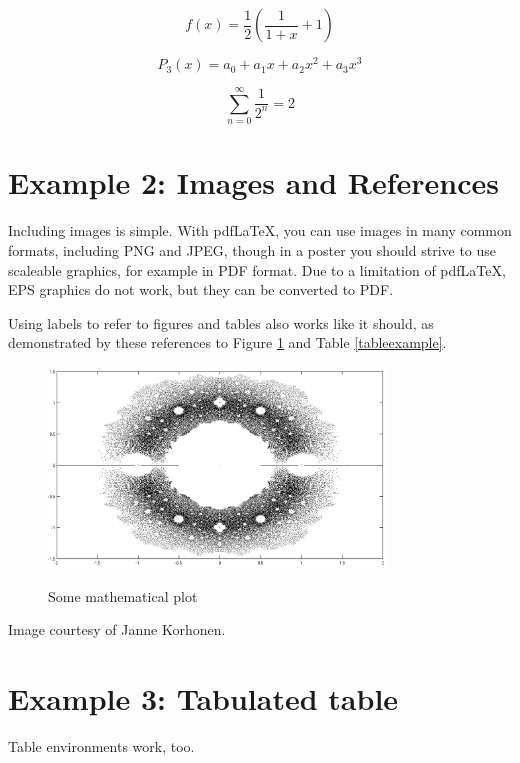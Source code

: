 \documentclass[final]{beamer}
\begin{document}
\begin{poster}
\begin{equation}
	f(x) = \frac{1}{2}\left(\frac{1}{1+x} + 1\right)
\end{equation}

\begin{equation}
	P_3(x) = a_0 + a_1 x + a_2 x^2 + a_3 x^3
\end{equation}

\begin{equation}
	\sum_{n=0}^\infty \frac{1}{2^n} = 2
\end{equation}



\section{Example 2: Images and References}
Including images is simple.  With pdf\LaTeX, you can use images in many common formats, including PNG and JPEG, though in a poster you should strive to use scaleable graphics, for example in PDF format. Due to a limitation of pdf\LaTeX, EPS graphics do not work, but they can be converted to PDF.
	
Using labels to refer to figures and tables also works like it should, as demonstrated by these references to Figure \ref{examplefigure} and Table \ref{tableexample}.

\begin{figure}
\includegraphics[width=0.8\textwidth]{zeros.png}
\label{examplefigure}
\caption{Some mathematical plot}
\end{figure}

Image courtesy of Janne Korhonen.


\section{Example 3: Tabulated table}

Table environments work, too.


\end{poster}
\end{document}
